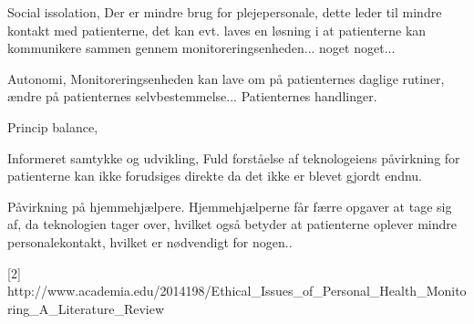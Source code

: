 Social issolation, 
Der er mindre brug for plejepersonale, dette leder til mindre kontakt med patienterne, det kan evt. laves en løsning i at patienterne kan kommunikere sammen gennem monitoreringsenheden... noget noget...

Autonomi, 
Monitoreringsenheden kan lave om på patienternes daglige rutiner, ændre på patienternes selvbestemmelse... Patienternes handlinger.

Princip balance, 


Informeret samtykke og udvikling, 
Fuld forståelse af teknologeiens påvirkning for patienterne kan ikke forudsiges direkte da det ikke er blevet gjordt endnu.

Påvirkning på hjemmehjælpere.
Hjemmehjælperne får færre opgaver at tage sig af, da teknologien tager over, hvilket også betyder at patienterne oplever mindre personalekontakt, hvilket er nødvendigt for nogen..


[2] http://www.academia.edu/2014198/Ethical_Issues_of_Personal_Health_Monitoring_A_Literature_Review 